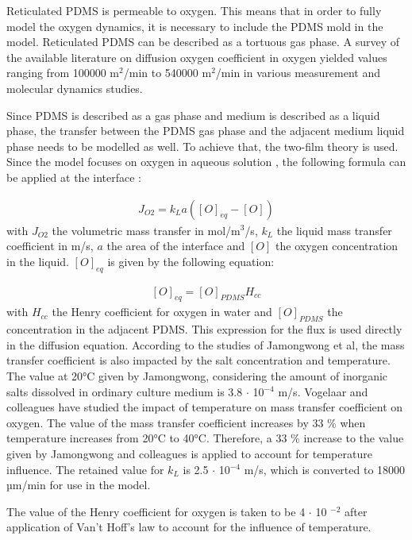 \documentclass[11pt,a4paper]{article}
\begin{document}
Reticulated PDMS is permeable to oxygen. This means that in order to fully model the oxygen dynamics, it is necessary to include the PDMS mold in the model. Reticulated PDMS can be described as a tortuous gas phase. A survey of the available literature on diffusion oxygen coefficient in oxygen yielded values ranging from 100000 \textmu m$^2$/min to 540000 \textmu m$^2$/min in various measurement and molecular dynamics studies.\cite{Ullal2014}\cite{Sudibjo2011}\cite{Park2006}\cite{Ziomek1991}\cite{KimM2013}

Since PDMS is described as a gas phase and medium is described as a liquid phase, the transfer between the PDMS gas phase and the adjacent medium liquid phase needs to be modelled as well. To achieve that, the two-film theory is used.\cite{Doran2012} Since the model focuses on oxygen in aqueous solution , the following formula can be applied at the interface :

\begin{align}
\label{eqn:2FT} J_{O2} =  k_L a([O]_{eq}-[O]) 
\end{align}
with $J_{O2}$ the volumetric mass transfer in mol/m$^3$/s, $k_L$ the liquid mass transfer coefficient in m/s, $a$ the area of the interface and $[O]$ the oxygen concentration in the liquid. $[O]_{eq}$ is given by the following equation:

\begin{align}
\label{eqn:HO} [O]_{eq} =  [O]_{PDMS}H_{cc} 
\end{align}
with $H_{cc}$ the Henry coefficient for oxygen in water and $[O]_{PDMS}$ the concentration in the adjacent PDMS. This expression for the flux is used directly in the diffusion equation. According to the studies of Jamongwong et al, the mass transfer coefficient is also impacted by the salt concentration and temperature. The value at 20°C given by Jamongwong, considering the amount of inorganic salts dissolved in ordinary culture medium is 3.8 $\cdot$ 10$^{-4}$ m/s\cite{Jamongwong2010}. Vogelaar and colleagues have studied the impact of temperature on mass transfer coefficient on oxygen.\cite{Vogelaar2000} The value of the mass transfer coefficient increases by 33 \% when temperature increases from 20°C to 40°C. Therefore, a 33 \% increase to the value given by Jamongwong and colleagues is applied to account for temperature influence. The retained value for $k_L$ is 2.5 $\cdot$ 10$^{-4}$ m/s, which is converted to 18000 µm/min for use in the model. 

The value of the Henry coefficient for oxygen is taken to be 4 $\cdot$ 10 $^{-2}$ after application of Van't Hoff's law to account for the influence of temperature.
\end{document}
